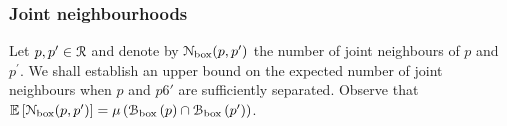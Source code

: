 \subsubsection*{Joint neighbourhoods}

Let $p, p^\prime \in {\mathcal R}$ and denote by
${\mathcal N}_{\text{box}}(p,p^\prime)$ the number of joint neighbours of $p$ and $p^\prime$. We shall establish an upper bound on the expected number of joint neighbours when $p$ and $p6\prime$ are sufficiently separated. Observe that $\mathbb{E}\left[{\mathcal N}_{\text{box}}(p,p^\prime)\right] = \mu\left({\mathcal B}_{\text{box}}\left(p\right) \cap {\mathcal B}_{\text{box}}\left(p^\prime\right)\right)$. 

